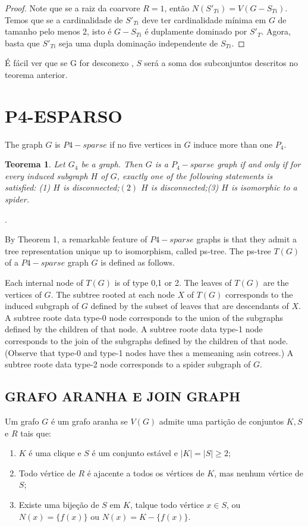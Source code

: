 \documentclass[a4paper,8pt]{article}
\theoremstyle{plain}
\newtheorem{theorem}{Teorema}[section]
\begin{document}
\begin{proof}
Note que se a raiz da coarvore $R=1$, então $N(S'_{Ti})=V(G-S_{Ti})$. Temos que se a cardinalidade de $S'_{Ti}$ deve ter cardinalidade mínima em $G$ de tamanho pelo menos 2, isto é $G-S_{Ti}$ é duplamente dominado por  $S'_{T}$. Agora, basta que $S'_{Ti}$ seja uma dupla dominação independente de $S_{Ti}$.
\end{proof}{}

É fácil ver que se G for desconexo , $S$ será a soma dos subconjuntos descritos no teorema anterior.


\section{P4-ESPARSO}
The graph $G$  is $P4-sparse$ if no five vertices in $G$ induce more than one $P_4$.

\begin{theorem}
 Let $G_4$ be a graph. Then $G$ is a $P_4-sparse$ graph if and only if for every induced subgraph $H$ of $G$, exactly one of the following statements is satisfied: (1) $H$ is disconnected;$(2)$ $H$ is disconnected;(3) $H$ is isomorphic to a spider.

\end{theorem}
.

By Theorem 1, a remarkable feature of $P4-sparse$  graphs is that they admit a tree representation unique up to isomorphism, called ps-tree. The ps-tree $T(G)$ of a $P4-sparse$ graph $G$ is defined as follows.

Each internal node of $T(G)$ is of type 0,1 or 2. The leaves of $T(G)$ are the vertices of $G$. The subtree rooted at each node $X$ of $T(G)$ corresponds to the induced subgraph of $G$ defined by the subset of leaves that are descendants of $X$. A subtree roote data type-0 node corresponds to the union of the subgraphs defined by the children of that node. A subtree roote data type-1 node corresponds to the join of the subgraphs defined by the children of that  node. (Observe that type-0 and type-1 nodes have thes a memeaning asin cotrees.) A subtree roote data type-2 node corresponds to a spider subgraph of $G$.


\subsection{GRAFO ARANHA E JOIN GRAPH}
Um grafo $G$ é um grafo aranha se $V(G)$ admite uma partição de conjuntos $K,S$ e $R$ tais que:

\begin{enumerate}
    \item $K$ é uma clique e $S$ é um conjunto estável e $|K|=|S|\geq2$;
    \item Todo vértice de $R$ é ajacente a todos os vértices de $K$, mas nenhum vértice de $S$;
    \item Existe uma bijeção de $S$ em $K$, talque todo vértice $x \in S$, ou $N(x)=\{f(x)\}$ ou $N(x)=K- \{f(x)\}$.
\end{enumerate}
\end{document}
